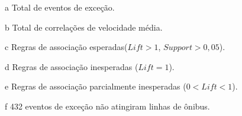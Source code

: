 \documentclass[
	12pt,				%
	oneside,			%
	a4paper,			%
	english,			%
	brazil				%
	]{abntex2ppgsi}
\begin{document}
{{\begin{apendicesenv}
\begin{table}[!htb]
\begin{threeparttable}
\begin{tablenotes}
            \item[a] Total de eventos de exceção.
            \item[b] Total de correlações de velocidade média.
            \item[c] Regras de associação esperadas($Lift > 1$, $Support > 0,05$).
            \item[d] Regras de associação inesperadas ($Lift = 1$).
            \item[e] Regras de associação parcialmente inesperadas ($0 < Lift < 1$).
            \item[f] 432 eventos de exceção não atingiram linhas de ônibus.
        \end{tablenotes}
\end{threeparttable}
\end{table}


\end{apendicesenv}}}
\end{document}
